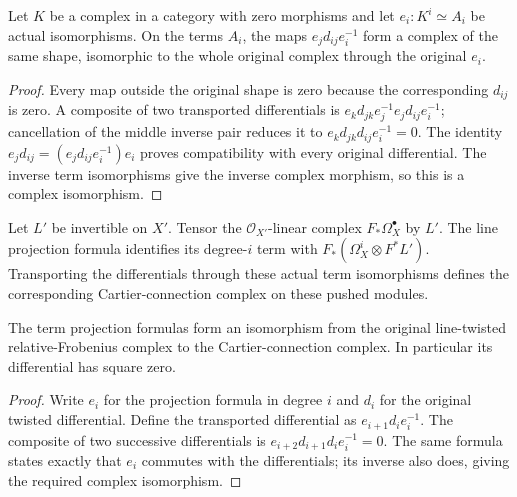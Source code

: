 \begin{lemma}
\label{lem:kn-complex-term-transport}
\leanok
Let $K$ be a complex in a category with zero morphisms and let
$e_i:K^i\simeq A_i$ be actual isomorphisms.  On the terms $A_i$,
the maps $e_jd_{ij}e_i^{-1}$ form a complex of the same shape,
isomorphic to the whole original complex through the original $e_i$.
\end{lemma}
\begin{proof}
Every map outside the original shape is zero because the corresponding
$d_{ij}$ is zero.  A composite of two transported differentials is
$e_kd_{jk}e_j^{-1}e_jd_{ij}e_i^{-1}$; cancellation of the middle
inverse pair reduces it to $e_kd_{jk}d_{ij}e_i^{-1}=0$.
The identity $e_jd_{ij}=(e_jd_{ij}e_i^{-1})e_i$ proves compatibility
with every original differential.  The inverse term isomorphisms give
the inverse complex morphism, so this is a complex isomorphism.
\end{proof}

\begin{definition}
\label{def:kn-cartier-connection-complex}
\leanok
Let $L'$ be invertible on $X'$.  Tensor the $\mathcal O_{X'}$-linear
complex $F_*\Omega_X^\bullet$ by $L'$.  The line projection formula
identifies its degree-$i$ term with
$F_*(\Omega_X^i\otimes F^*L')$.  Transporting the differentials
through these actual term isomorphisms defines the corresponding
Cartier-connection complex on these pushed modules.
\end{definition}

\begin{lemma}
\label{lem:kn-cartier-connection-complex-iso}
\leanok
{}
The term projection formulas form an isomorphism from the original
line-twisted relative-Frobenius complex to the Cartier-connection
complex.  In particular its differential has square zero.
\end{lemma}
\begin{proof}
Write $e_i$ for the projection formula in degree $i$ and $d_i$ for
the original twisted differential.  Define the transported
differential as $e_{i+1}d_i e_i^{-1}$.  The composite of two successive
differentials is $e_{i+2}d_{i+1}d_i e_i^{-1}=0$.  The same formula
states exactly that $e_i$ commutes with the differentials; its inverse
also does, giving the required complex isomorphism.
\end{proof}

